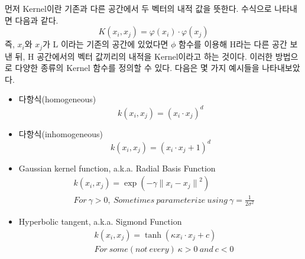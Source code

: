 \documentclass[a4paper]{oblivoir}
\begin{document}
\indent 먼저 Kernel이란 기존과 다른 공간에서 두 벡터의 내적 값을 뜻한다. 수식으로 나타내면 다음과 같다.
\begin{equation}
K(x_i,x_j)=\varphi(x_i)\cdot\varphi(x_j)
\label{eq:5-33}
\end{equation}
즉, $x_i$와 $x_j$가 L 이라는 기존의 공간에 있었다면 $\phi$ 함수를 이용해 H라는 다른 공간 보낸 뒤, H 공간에서의 벡터 값끼리의 내적을 Kernel이라고 하는 것이다. 이러한 방법으로 다양한 종류의 Kernel 함수를 정의할 수 있다. 다음은 몇 가지 예시들을 나타내보았다.
\begin{itemize}\setlength\itemsep{-\parsep}
	\item 다항식(homogeneous)
	\begin{equation}
	k(x_i,x_j)=(x_i\cdot x_j)^d
	\label{eq:5-34}
	\end{equation}
\end{itemize}
\begin{itemize}\setlength\itemsep{-\parsep}
	\item 다항식(inhomogeneous)
	\begin{equation}
	k(x_i,x_j)=(x_i\cdot x_j+1)^d
	\label{eq:5-35}
	\end{equation}
\end{itemize}
\begin{itemize}\setlength\itemsep{-\parsep}
	\item Gaussian kernel function, a.k.a. Radial Basis Function
	\begin{equation}
	\begin{split}
	&k(x_i,x_j)={\exp}(-\gamma{\lVert x_i-x_j\rVert}^2)\\
	&For\ \gamma>0,\ Sometimes\ parameterize\ using\ \gamma=\frac{1}{2\sigma^2}
	\end{split}
	\label{eq:5-36}
	\end{equation}
\end{itemize}
\begin{itemize}\setlength\itemsep{-\parsep}
	\item Hyperbolic tangent, a.k.a. Sigmond Function
	\begin{equation}
	\begin{split}
	&k(x_i,x_j)={\tanh}(\kappa x_i\cdot x_j+c)\\
	&For\ some(not\ every)\ \kappa>0\ and\ c<0
	\end{split}
	\label{eq:5-37}
	\end{equation}
\end{itemize}
\end{document}
